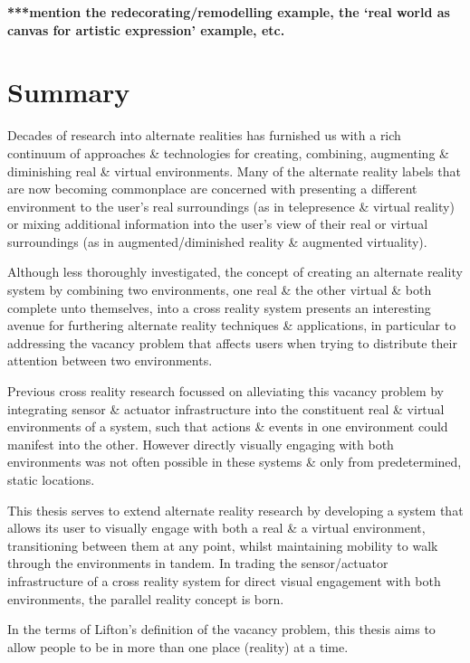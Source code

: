 \textbf{***mention the redecorating/remodelling example, the `real world as canvas for artistic expression' example, etc.}


\section{Summary}
Decades of research into alternate realities has furnished us with a rich continuum of approaches \& technologies for creating, combining, augmenting \& diminishing real \& virtual environments. Many of the alternate reality labels that are now becoming commonplace are concerned with presenting a different environment to the user's real surroundings (as in telepresence \& virtual reality) or mixing additional information into the user's view of their real or virtual surroundings (as in augmented/diminished reality \& augmented virtuality).

Although less thoroughly investigated, the concept of creating an alternate reality system by combining two environments, one real \& the other virtual \& both complete unto themselves, into a cross reality system presents an interesting avenue for furthering alternate reality techniques \& applications, in particular to addressing the vacancy problem that affects users when trying to distribute their attention between two environments.

Previous cross reality research focussed on alleviating this vacancy problem by integrating sensor \& actuator infrastructure into the constituent real \& virtual environments of a system, such that actions \& events in one environment could manifest into the other. However directly visually engaging with both environments was not often possible in these systems \& only from predetermined, static locations.

This thesis serves to extend alternate reality research by developing a system that allows its user to visually engage with both a real \& a virtual environment, transitioning between them at any point, whilst maintaining mobility to walk through the environments in tandem. In trading the sensor/actuator infrastructure of a cross reality system for direct visual engagement with both environments, the parallel reality concept is born.

In the terms of Lifton's definition of the vacancy problem, this thesis aims to allow people to be in more than one place (reality) at a time.